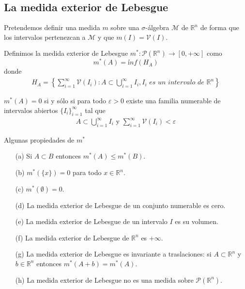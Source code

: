 \subsection{La medida exterior de Lebesgue}
Pretendemos definir una medida $m$ sobre una $\sigma$-álgebra $\mathcal{M}$ de $\mathbb{R}^n$ de forma que los intervalos pertenezcan a $\mathcal{M}$ y que $m(I) = \mathcal{V}(I)$.
\begin{defi}
Definimos la medida exterior de Lebesgue $m^*: \mathcal{P}(\mathbb{R}^n) \longrightarrow [0, +\infty]$ como
$$m^*(A) = ínf(H_A)$$
donde 
\begin{align*}
    H_A = \left\{ \sum_{i=1}^{\infty}{\mathcal{V}(I_i)} : A \subset \bigcup_{i=1}^{\infty}{I_i}, I_i \textit{ es un intervalo de } \mathbb{R}^n \right\}
\end{align*}
\end{defi}
\begin{obs}
$m^*(A) = 0$ si y sólo si para todo $\varepsilon > 0$ existe una familia numerable de intervalos abiertos $\{ I_i\}_{i=1}^{\infty}$ tal que
\begin{align*}
    A \subset \bigcup_{i=1}^{\infty}{I_i} \text{ y } \sum_{i=1}^{\infty}{\mathcal{V}(I_i)} < \varepsilon
\end{align*}
\end{obs}
\begin{prop}
Algunas propiedades de $m^*$
\begin{enumerate}
    \item[(a)] Si $A \subset B$ entonces $m^*(A) \leq m^*(B)$.
    \item[(b)] $m^*(\{ x \}) = 0$ para todo $x \in \mathbb{R}^n$.
    \item[(c)] $m^*(\emptyset) = 0$.
    \item[(d)] La medida exterior de Lebesgue de un conjunto numerable es cero.
    \item[(e)] La medida exterior de Lebesgue de un intervalo $I$ es su volumen.
    \item[(f)] La medida exterior de Lebesgue de $\mathbb{R}^n$ es $+\infty$.
    \item[(g)] La medida exterior de Lebesgue es invariante a traslaciones: si $A \subset \mathbb{R}^n$ y $b \in \mathbb{R}^n$ entonces $m^*(A + b) = m^*(A)$.
    \item[(h)] La medida exterior de Lebesgue no es una medida sobre $\mathcal{P}(\mathbb{R}^n)$.
\end{enumerate}
\end{prop}
